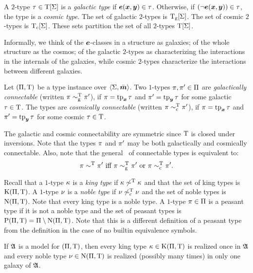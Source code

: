 \begin{definition}
A $2$-type $\tau \in \mathrm{T}[\mathrm{\Sigma}]$ is a \emph{galactic type} if $\bm{e}(\bm{x},\bm{y}) \in
\tau$.
Otherwise, if $(\lnot\bm{e}(\bm{x},\bm{y})) \in \tau$, the type is a \emph{cosmic type}.
The set of galactic $2$-types is $\mathrm{T}_{\mathrm{g}}[\mathrm{\Sigma}]$.
The set of cosmic $2$-types is $\mathrm{T}_{\mathrm{c}}[\mathrm{\Sigma}]$. These sets partition the set of all
$2$-types $\mathrm{T}[\mathrm{\Sigma}]$.
\end{definition}
Informally, we think of the $\bm{e}$-classes in a structure as galaxies; of the
whole structure as the cosmos; of the galactic $2$-types as characterizing the
interactions in the internals of the galaxies, while cosmic $2$-types
characterize the interactions between different galaxies.

\begin{definition}
Let $(\Pi,\mathrm{T})$ be a type instance over $\left\langle \mathrm{\Sigma},\bar{\bm{m}} \right\rangle$.
Two $1$-types $\pi, {\pi'} \in \Pi$ are \emph{galactically connectable}
(written $\pi \sim_{\mathrm{g}}^{\mathrm{T}} {\pi'}$), if $\pi = \operatorname{tp}_{\bm{x}}\tau$ and ${\pi'} =
\operatorname{tp}_{\bm{y}}\tau$ for some galactic $\tau \in \mathrm{T}$.
The types are \emph{cosmically connectable} (written $\pi \sim_{\mathrm{c}}^{\mathrm{T}}
{\pi'}$), if $\pi = \operatorname{tp}_{\bm{x}}\tau$ and ${\pi'} = \operatorname{tp}_{\bm{y}}\tau$ for some cosmic $\tau \in \mathrm{T}$.

The galactic and cosmic connectability are symmetric since $\mathrm{T}$ is closed
under inversions.
Note that the types $\pi$ and ${\pi'}$ may be both galactically and cosmically
connectable. Also, note that the general~ of connectable
types is equivalent to:
\[
  \pi \sim^{\mathrm{T}} {\pi'} \text{ iff } 
  \pi \sim_{\mathrm{g}}^{\mathrm{T}} {\pi'} \text{ or } \pi \sim_{\mathrm{c}}^{\mathrm{T}} {\pi'}.
\]

Recall that a $1$-type $\kappa$ is a \emph{king type} if $\kappa \not\sim^{\mathrm{T}}
\kappa$ and that the set of king types is $\mathrm{K}(\Pi,\mathrm{T})$.
A $1$-type $\nu$ is a \emph{noble type} if $\nu \not\sim_{\mathrm{c}}^{\mathrm{T}} \nu$ and
the set of noble types is $\mathrm{\mathrm{N}}(\Pi,\mathrm{T})$.
Note that every king type is a noble type. A $1$-type $\pi \in \Pi$ is a
peasant type if it is not a noble type and the set of peasant types is
$\mathrm{P}(\Pi,\mathrm{T}) = \Pi \setminus \mathrm{\mathrm{N}}(\Pi,\mathrm{T})$.
Note that this is a different definition of a peasant type from the definition
in the case of no builtin equivalence symbols.
\end{definition}

\begin{remark}\label{rem:twovar-noble-once}
If $\mathfrak{A}$ is a model for $(\Pi,\mathrm{T})$, then every king type
$\kappa \in \mathrm{K}(\Pi,\mathrm{T})$ is realized once in $\mathfrak{A}$ and every noble type
$\nu \in \mathrm{\mathrm{N}}(\Pi,\mathrm{T})$ is realized (possibly many times) in only one galaxy
of $\mathfrak{A}$.
\end{remark}

